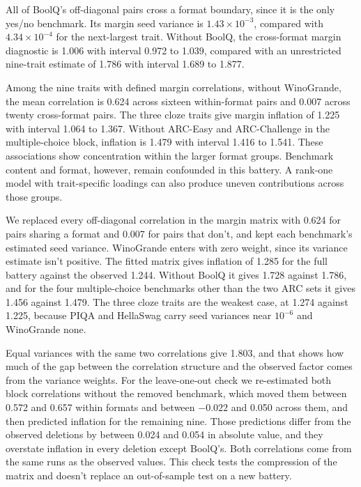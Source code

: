 All of BoolQ's off-diagonal pairs cross a format boundary, since it is the only yes/no benchmark. Its margin seed variance is $1.43\times10^{-3}$, compared with $4.34\times10^{-4}$ for the next-largest trait. Without BoolQ, the cross-format margin diagnostic is 1.006 with interval 0.972 to 1.039, compared with an unrestricted nine-trait estimate of 1.786 with interval 1.689 to 1.877.

Among the nine traits with defined margin correlations, without WinoGrande, the mean correlation is 0.624 across sixteen within-format pairs and 0.007 across twenty cross-format pairs. The three cloze traits give margin inflation of 1.225 with interval 1.064 to 1.367. Without ARC-Easy and ARC-Challenge in the multiple-choice block, inflation is 1.479 with interval 1.416 to 1.541. These associations show concentration within the larger format groups. Benchmark content and format, however, remain confounded in this battery. A rank-one model with trait-specific loadings can also produce uneven contributions across those groups.

\label{app:formatfit}
We replaced every off-diagonal correlation in the margin matrix with 0.624 for pairs sharing a format and 0.007 for pairs that don't, and kept each benchmark's estimated seed variance. WinoGrande enters with zero weight, since its variance estimate isn't positive. The fitted matrix gives inflation of 1.285 for the full battery against the observed 1.244. Without BoolQ it gives 1.728 against 1.786, and for the four multiple-choice benchmarks other than the two ARC sets it gives 1.456 against 1.479. The three cloze traits are the weakest case, at 1.274 against 1.225, because PIQA and HellaSwag carry seed variances near $10^{-6}$ and WinoGrande none.

Equal variances with the same two correlations give 1.803, and that shows how much of the gap between the correlation structure and the observed factor comes from the variance weights. For the leave-one-out check we re-estimated both block correlations without the removed benchmark, which moved them between 0.572 and 0.657 within formats and between $-0.022$ and 0.050 across them, and then predicted inflation for the remaining nine. Those predictions differ from the observed deletions by between 0.024 and 0.054 in absolute value, and they overstate inflation in every deletion except BoolQ's. Both correlations come from the same runs as the observed values. This check tests the compression of the matrix and doesn't replace an out-of-sample test on a new battery.


